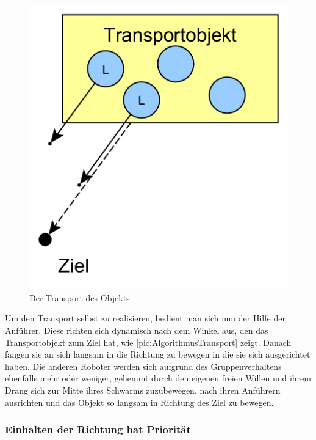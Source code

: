 \begin{figure}
	\includegraphics[width=\pictureWidthSmall,keepaspectratio]{graphics/AlgorithmusTransport.png}
	\caption{Der Transport des Objekts}
	\label{pic:AlgorithmusTransport}
\end{figure}

Um den Transport selbst zu realisieren, bedient man sich nun der Hilfe der Anführer. Diese richten sich dynamisch nach dem Winkel aus, den das Transportobjekt zum Ziel hat, wie \autoref{pic:AlgorithmusTransport} zeigt. Danach fangen sie an sich langsam in die Richtung zu bewegen in die sie sich ausgerichtet haben. Die anderen Roboter werden sich aufgrund des Gruppenverhaltens ebenfalls mehr oder weniger, gehemmt durch den eigenen freien Willen und ihrem Drang sich zur Mitte ihres Schwarms zuzubewegen, nach ihren Anführern ausrichten und das Objekt so langsam in Richtung des Ziel zu bewegen.

\subsubsection*{Einhalten der Richtung hat Priorität}

